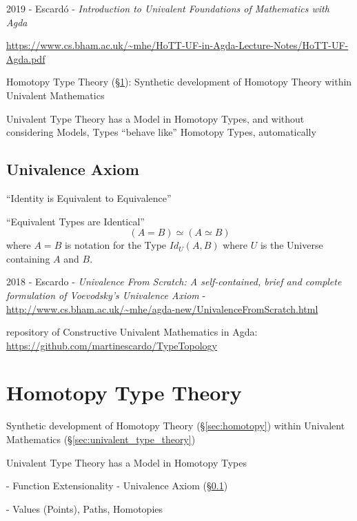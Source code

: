 2019 - Escard\'o -
\emph{Introduction to Univalent Foundations of Mathematics with Agda}

\url{https://www.cs.bham.ac.uk/~mhe/HoTT-UF-in-Agda-Lecture-Notes/HoTT-UF-Agda.pdf}{

\fist Homotopy Type Theory (\S\ref{sec:hott}): Synthetic development of Homotopy
Theory within Univalent Mathematics

Univalent Type Theory has a Model in Homotopy Types, and without considering
Models, Types ``behave like'' Homotopy Types, automatically



\subsection{Univalence Axiom}\label{sec:univalence_axiom}

``Identity is Equivalent to Equivalence''

``Equivalent Types are Identical''
\[
  (A = B) \simeq (A \simeq B)
\]
where $A = B$ is notation for the Type $Id_U(A,B)$ where $U$ is the
Universe containing $A$ and $B$.

2018 - Escardo - \emph{Univalence From Scratch: A self-contained, brief and
  complete formulation of Voevodsky's Univalence Axiom}
- \url{http://www.cs.bham.ac.uk/~mhe/agda-new/UnivalenceFromScratch.html}

repository of Constructive Univalent Mathematics in Agda:
\url{https://github.com/martinescardo/TypeTopology}



\section{Homotopy Type Theory}\label{sec:hott}

Synthetic development of Homotopy Theory (\S\ref{sec:homotopy}) within
Univalent Mathematics (\S\ref{sec:univalent_type_theory})

Univalent Type Theory has a Model in Homotopy Types

- Function Extensionality
- Univalence Axiom (\S\ref{sec:univalence_axiom})

- Values (Points), Paths, Homotopies

}
